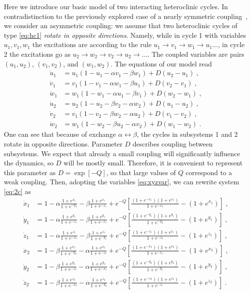 \documentclass[3p,number,review,sort&compress]{elsarticle}
\begin{document}
Here we introduce our basic model of two interacting heteroclinic cycles.
In contradistinction to the previously explored case of a nearly symmetric
coupling~\cite{PhysRevE.85.016215}, we consider an asymmetric coupling: we assume that two heteroclinic cycles of type \eqref{eq:hc1}
\textit{rotate in opposite directions}. Namely, while in cycle 1 with variables $u_1,v_1,w_1$ the excitations are according to the rule
$u_1\to v_1\to w_1\to u_1\ldots$, in cycle 2 the excitations
go as $u_2\to w_2\to v_2\to u_2\to\ldots$. The coupled variables
are pairs $(u_1,u_2)$, $(v_1,v_2)$, and $(w_1,w_2)$. The equations of our model read
\begin{equation}
\begin{aligned}
\dot u_1&=u_1(1-u_1-\alpha v_1-\beta w_1)+D(u_2-u_1)\;,\\
\dot v_1&=v_1(1-v_1-\alpha w_1-\beta u_1)+D(v_2-v_1)\;,\\
\dot w_1&=w_1(1-w_1-\alpha u_1-\beta v_1)+D(w_2-w_1)\;,\\
\dot u_2&=u_2(1-u_2-\beta v_2-\alpha w_2)+D(u_1-u_2)\;,\\
\dot v_2&=v_1(1-v_2-\beta w_2-\alpha u_2)+D(v_1-v_2)\;,\\
\dot w_2&=w_1(1-w_2-\beta u_2-\alpha v_2)+D(w_1-w_2)\;.
\end{aligned}
\label{eq:2c}
\end{equation}
One can see that because of exchange $\alpha\leftrightarrow\beta$, the cycles
in subsystems 1 and 2 rotate in opposite directions. Parameter $D$ describes coupling between subsystems. We expect that already a small coupling will significantly influence the dynamics, so $D$ will be mostly small. Therefore,
it is convenient to represent this parameter as $D=\exp[-Q]$, so that large values of $Q$ correspond to a weak coupling. Then, adopting
the variables \eqref{eq:xyzvar}, we can rewrite system \eqref{eq:2c} as
\begin{equation}
\begin{aligned}
\dot x_1&=1-\alpha \frac{1+e^{x_1}}{1+e^{-{y_1}}}-\beta \frac{1+e^{x_1}}{1+e^{-z_1}}
+e^{-Q}\left[\frac{(1+e^{-x_1})(1+e^{x_1})}{1+e^{-x_2}}-(1+e^{x_1})\right]\;,\\
\dot y_1&=1-\alpha \frac{1+e^{y_1}}{1+e^{-z_1}}-\beta \frac{1+e^{y_1}}{1+e^{-x_1}}
+e^{-Q}\left[\frac{(1+e^{-y_1})(1+e^{y_1})}{1+e^{-y_2}}-(1+e^{y_1})\right]\;,\\
\dot z_1&=1-\alpha \frac{1+e^{z_1}}{1+e^{-x_1}}-\beta \frac{1+e^{z_1}}{1+e^{-{y_1}}}
+e^{-Q}\left[\frac{(1+e^{-z_1})(1+e^{z_1})}{1+e^{-z_2}}-(1+e^{z_1})\right]\;,\\
\dot x_2&=1-\beta \frac{1+e^{x_2}}{1+e^{-y_2}}-\alpha \frac{1+e^{x_2}}{1+e^{-z_2}}
+e^{-Q}\left[\frac{(1+e^{-x_2})(1+e^{x_2})}{1+e^{-x_1}}-(1+e^{x_2})\right]\;,\\
\dot y_2&=1-\beta \frac{1+e^{y_2}}{1+e^{-z_2}}-\alpha \frac{1+e^{y_2}}{1+e^{-x_2}}
+e^{-Q}\left[\frac{(1+e^{-y_2})(1+e^{y_2})}{1+e^{-y_1}}-(1+e^{y_2})\right]\;,\\
\dot z_2&=1-\beta \frac{1+e^{z_2}}{1+e^{-x_2}}-\alpha \frac{1+e^{z_2}}{1+e^{-y_2}}
+e^{-Q}\left[\frac{(1+e^{-z_2})(1+e^{z_2})}{1+e^{-z_1}}-(1+e^{z_2})\right]\;.\\
\end{aligned}
\label{eq:trc}
\end{equation}
\end{document}

